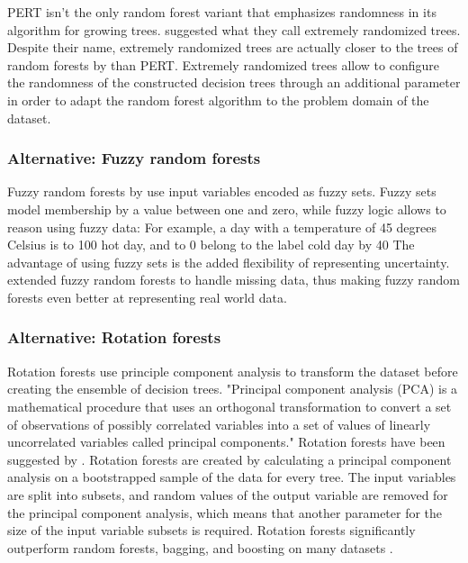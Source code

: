 \documentclass[a4paper,man,12pt,apacite]{apa6} %
\begin{document}
PERT isn't the only random forest variant that emphasizes randomness in its
algorithm for growing trees.
\cite{geurts2006extremely} suggested what they call extremely randomized trees.
Despite their name, extremely randomized trees are actually closer to the
trees of random forests by \cite{breiman2001random} than PERT.
Extremely randomized trees allow to configure the randomness of the
constructed decision trees through an additional parameter in order to adapt
the random forest algorithm to the problem domain of the dataset.

\subsubsection{Alternative: Fuzzy random forests}
Fuzzy random forests by \cite{bonissone2008fuzzy} use input variables
encoded as fuzzy sets.
Fuzzy sets \cite{wpFS} model membership by a value between one and zero,
while fuzzy logic \cite{wpFL} allows to reason using fuzzy data:
For example, a day with a temperature of 45 degrees Celsius is to 100%
hot day, and to 0%
belong to the label cold day by 40%
The advantage of using fuzzy sets is the added flexibility of representing
uncertainty.
\cite{cadenas2012extending} extended fuzzy random forests to handle
missing data, thus making fuzzy random forests even better at representing
real world data.

\subsubsection{Alternative: Rotation forests}
Rotation forests use principle component analysis to transform
the dataset before creating the ensemble of decision trees.
"Principal component analysis (PCA) is a mathematical procedure that uses
an orthogonal transformation to convert a set of observations of possibly
correlated variables into a set of values of linearly uncorrelated variables
called principal components." \cite{wpPCA}
Rotation forests have been suggested by \cite{rodriguez2006rotation}.
Rotation forests are created by calculating a principal component analysis
on a bootstrapped sample of the data for every tree.
The input variables are split into subsets, and random values of the output
variable are removed for the principal component analysis, which means that
another parameter for the size of the input variable subsets is required.
Rotation forests significantly outperform random forests, bagging, and
boosting on many datasets \cite{rodriguez2006rotation}.
\end{document}
